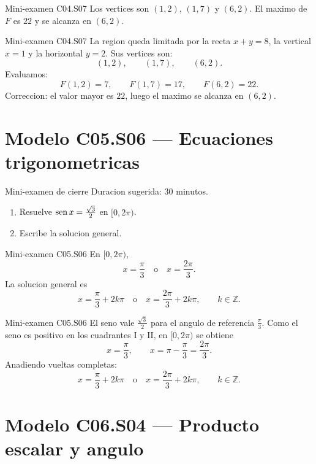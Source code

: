 \begin{shortanswer}{Mini-examen C04.S07}
Los vertices son \((1,2)\), \((1,7)\) y \((6,2)\). El maximo de \(F\) es \(22\) y se alcanza
en \((6,2)\).
\end{shortanswer}

\begin{fullsolution}{Mini-examen C04.S07}
La region queda limitada por la recta \(x+y=8\), la vertical \(x=1\) y la horizontal \(y=2\).
Sus vertices son:
\[
(1,2),\qquad (1,7),\qquad (6,2).
\]
Evaluamos:
\[
F(1,2)=7,\qquad F(1,7)=17,\qquad F(6,2)=22.
\]
Correccion: el valor mayor es \(22\), luego el maximo se alcanza en \((6,2)\).
\end{fullsolution}

\section{Modelo C05.S06 --- Ecuaciones trigonometricas}

\begin{exambrief}{Mini-examen de cierre}
Duracion sugerida: \(30\) minutos.
\begin{enumerate}
  \item Resuelve \(\operatorname{sen} x=\frac{\sqrt{3}}{2}\) en \([0,2\pi)\).
  \item Escribe la solucion general.
\end{enumerate}
\end{exambrief}

\begin{shortanswer}{Mini-examen C05.S06}
En \([0,2\pi)\),
\[
x=\frac{\pi}{3}\quad \text{o}\quad x=\frac{2\pi}{3}.
\]
La solucion general es
\[
x=\frac{\pi}{3}+2k\pi \quad \text{o}\quad x=\frac{2\pi}{3}+2k\pi,\qquad k\in\mathbb{Z}.
\]
\end{shortanswer}

\begin{fullsolution}{Mini-examen C05.S06}
El seno vale \(\frac{\sqrt{3}}{2}\) para el angulo de referencia \(\frac{\pi}{3}\). Como el
seno es positivo en los cuadrantes I y II, en \([0,2\pi)\) se obtiene
\[
x=\frac{\pi}{3},\qquad x=\pi-\frac{\pi}{3}=\frac{2\pi}{3}.
\]
Anadiendo vueltas completas:
\[
x=\frac{\pi}{3}+2k\pi \quad \text{o}\quad x=\frac{2\pi}{3}+2k\pi,\qquad k\in\mathbb{Z}.
\]
\end{fullsolution}

\section{Modelo C06.S04 --- Producto escalar y angulo}

